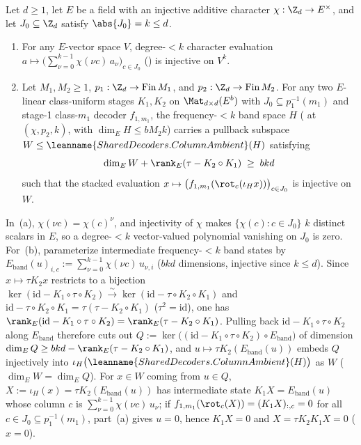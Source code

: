 \begin{lemma}\label{lem:vandermonde-subset}
Let $d \ge 1$, let $E$ be a field with an injective additive character $\chi : \Z_d \to E^\times$, and
let $J_0 \subseteq \Z_d$ satisfy $\abs{J_0} = k \le d$.
\begin{enumerate}[label=(\alph*)]
\item For any $E$-vector space $V$, degree-$< k$ character evaluation
  $a \mapsto \bigl(\sum_{\nu=0}^{k-1} \chi(\nu c)\,a_\nu\bigr)_{c \in J_0}$
  () is injective on $V^k$.
\item Let $M_1, M_2 \ge 1$, $p_1 : \Z_d \to \mathrm{Fin}\,M_1$, and
  $p_2 : \Z_d \to \mathrm{Fin}\,M_2$. For any two $E$-linear class-uniform stages $K_1, K_2$ on
  $\Mat_{d\times d}(E^b)$ with $J_0 \subseteq p_1^{-1}(m_1)$ and stage-1 class-$m_1$ decoder
  $f_{1,m_1}$, the frequency-$< k$ band space $H$ ( at
  $(\chi, p_2, k)$, with $\dim_E H \le b M_2 k$) carries a pullback subspace
  $W \le \leanname{SharedDecoders.ColumnAmbient}(H)$ satisfying
  \[
    \dim_E W + \rank_E(\tau - K_2 \circ K_1) \;\ge\; b k d
  \]
  such that the stacked evaluation $x \mapsto \bigl(f_{1,m_1}(\rot_c(\iota_H x))\bigr)_{c \in J_0}$
  is injective on $W$.
\end{enumerate}
\end{lemma}
\begin{outline}
In~(a), $\chi(\nu c) = \chi(c)^\nu$, and injectivity of $\chi$ makes $\{\chi(c) : c \in J_0\}$
$k$ distinct scalars in $E$, so a degree-$< k$ vector-valued polynomial vanishing on $J_0$ is zero.
For~(b), parameterize intermediate frequency-$< k$ band states by
$E_{\mathrm{band}}(u)_{i, c} := \sum_{\nu=0}^{k-1} \chi(\nu c)\,u_{\nu, i}$ ($b k d$ dimensions,
injective since $k \le d$). Since $x \mapsto \tau K_2 x$ restricts to a bijection
$\ker(\mathrm{id} - K_1 \circ \tau \circ K_2) \xrightarrow{\sim}
\ker(\mathrm{id} - \tau \circ K_2 \circ K_1)$ and
$\mathrm{id} - \tau \circ K_2 \circ K_1 = \tau(\tau - K_2 \circ K_1)$ ($\tau^2 = \mathrm{id}$), one
has $\rank_E(\mathrm{id} - K_1 \circ \tau \circ K_2) = \rank_E(\tau - K_2 \circ K_1)$. Pulling back
$\mathrm{id} - K_1 \circ \tau \circ K_2$ along $E_{\mathrm{band}}$ therefore cuts out
$Q := \ker\bigl((\mathrm{id} - K_1 \circ \tau \circ K_2) \circ E_{\mathrm{band}}\bigr)$ of dimension
$\dim_E Q \ge b k d - \rank_E(\tau - K_2 \circ K_1)$, and $u \mapsto \tau K_2(E_{\mathrm{band}}(u))$
embeds $Q$ injectively into $\iota_H\bigl(\leanname{SharedDecoders.ColumnAmbient}(H)\bigr)$ as $W$
($\dim_E W = \dim_E Q$). For
$x \in W$ coming from $u \in Q$, $X := \iota_H(x) = \tau K_2(E_{\mathrm{band}}(u))$ has intermediate
state $K_1 X = E_{\mathrm{band}}(u)$ whose column $c$ is $\sum_{\nu=0}^{k-1} \chi(\nu c)\,u_\nu$; if
$f_{1,m_1}(\rot_c(X)) = (K_1 X)_{:,c} = 0$ for all $c \in J_0 \subseteq p_1^{-1}(m_1)$, part~(a)
gives $u = 0$, hence $K_1 X = 0$ and $X = \tau K_2 K_1 X = 0$ ($x = 0$).
\end{outline}

